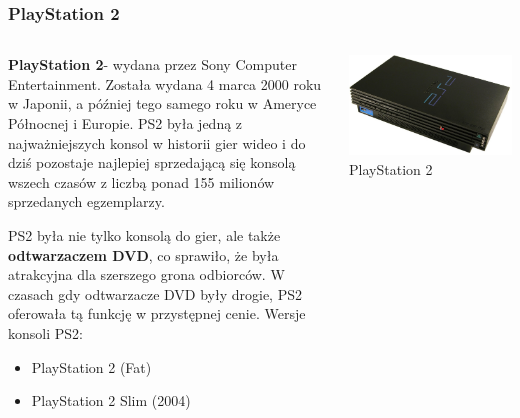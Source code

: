 \documentclass[8pt]{beamer}
\begin{document}
\begin{frame}
\frametitle{PlayStation 2}
\begin{columns}

\begin{column}{0.6\textwidth}
\textbf {PlayStation 2}- wydana przez Sony Computer Entertainment. Została wydana 4 marca 2000 roku w Japonii, a później tego samego roku w Ameryce Północnej i Europie. PS2 była jedną z najważniejszych konsol w historii gier wideo i do dziś pozostaje najlepiej sprzedającą się konsolą wszech czasów z liczbą ponad 155 milionów sprzedanych egzemplarzy.

\vspace{0.5em}

PS2 była nie tylko konsolą do gier, ale także \textbf {odtwarzaczem DVD}, co sprawiło, że była atrakcyjna dla szerszego grona odbiorców. W czasach gdy odtwarzacze DVD były drogie, PS2 oferowała tą funkcję w przystępnej cenie.
\vspace{0.5em} 
Wersje konsoli PS2:
\begin{itemize}
\item PlayStation 2 (Fat)
\item PlayStation 2 Slim (2004)
\end{itemize}
\end{column}

\begin{column}{0.35\textwidth}
        \centering
        \includegraphics[width=\textwidth]{PS2.jpg} 
        {\small PlayStation 2} 
    \end{column}
\end{columns}

\end{frame}
\end{document}
